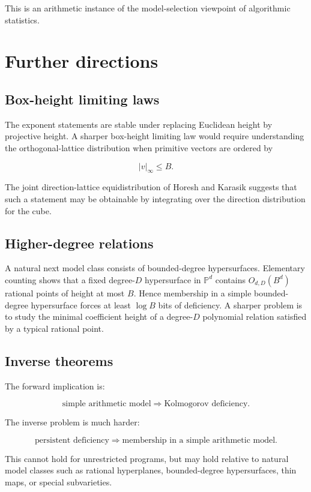 \documentclass[11pt]{article}
\begin{document}
This is an arithmetic instance of the model-selection viewpoint of algorithmic statistics.

\section{Further directions}

\subsection{Box-height limiting laws}

The exponent statements are stable under replacing Euclidean height by projective height. A sharper box-height limiting law would require understanding the orthogonal-lattice distribution when primitive vectors are ordered by

\[
|v|_\infty\le B.
\]

The joint direction-lattice equidistribution of Horesh and Karasik suggests that such a statement may be obtainable by integrating over the direction distribution for the cube.

\subsection{Higher-degree relations}

A natural next model class consists of bounded-degree hypersurfaces. Elementary counting shows that a fixed degree-$D$ hypersurface in $\mathbb P^d$ contains $O_{d,D}(B^d)$ rational points of height at most $B$. Hence membership in a simple bounded-degree hypersurface forces at least $\log B$ bits of deficiency. A sharper problem is to study the minimal coefficient height of a degree-$D$ polynomial relation satisfied by a typical rational point.

\subsection{Inverse theorems}

The forward implication is:

\[
\text{simple arithmetic model}
\Rightarrow
\text{Kolmogorov deficiency}.
\]

The inverse problem is much harder:

\[
\text{persistent deficiency}
\Rightarrow
\text{membership in a simple arithmetic model}.
\]

This cannot hold for unrestricted programs, but may hold relative to natural model classes such as rational hyperplanes, bounded-degree hypersurfaces, thin maps, or special subvarieties.
\end{document}
